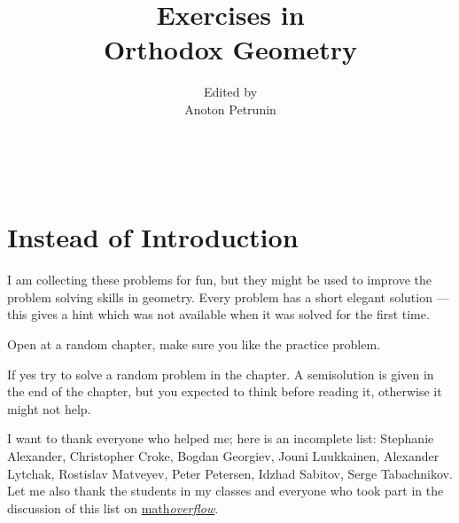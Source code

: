 \documentclass[twoside]{book}
\begin{document}
\title{Exercises in \\
Orthodox Geometry}
\author{Edited by\\
 Anoton Petrunin}

\date{}
\maketitle



\null\vfill{}

\ 

\thispagestyle{empty}

\tableofcontents

\newpage

\section*{Instead of Introduction}

I am collecting these problems for fun, 
but they might be used to improve 
the problem solving skills in geometry.
Every problem has a short elegant solution ---
this gives a hint which was not available
when it was solved for the first time.

Open at a random chapter, make sure you like the practice problem.

If yes try to solve a random problem in the chapter.
A semisolution is given in the end of the chapter,
but you expected to think before reading it,
otherwise it might not help. 

I want to thank everyone who helped me;
here is an incomplete list:
Stephanie Alexander,
Christopher Croke,
Bogdan Georgiev,
Jouni Luukkainen,
Alexander Lytchak,
Rostislav Matve\-yev, 
Peter Petersen, 
Idzhad Sabitov,
Serge Tabachnikov.
Let me also thank  the students in my classes 
and everyone who took part in the discussion of this list 
on \href{http://mathoverflow.net/questions/8247}{math\textit{overflow}}.
\end{document}
